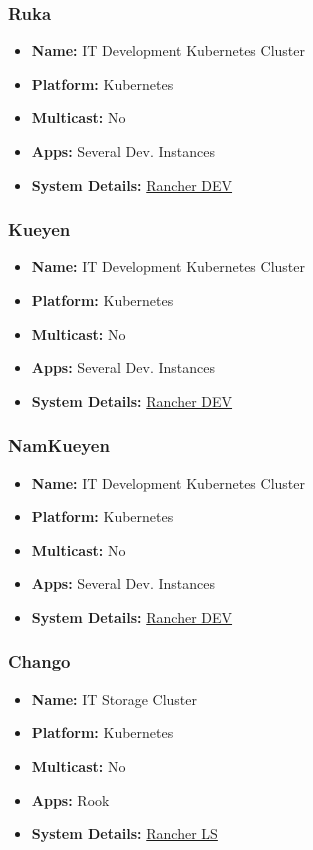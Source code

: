 \subsubsection{Ruka}
\begin{itemize}
  \itemsep0em 
  \item \textbf{Name:}       IT Development Kubernetes Cluster
  \item \textbf{Platform:}   Kubernetes
  \item \textbf{Multicast:}  No
  \item \textbf{Apps:}       Several Dev. Instances
  \item \textbf{System Details:} \href{https://rancher.dev.lsst.org}{Rancher DEV}
\end{itemize}

\subsubsection{Kueyen}
\begin{itemize}
  \itemsep0em 
  \item \textbf{Name:}       IT Development Kubernetes Cluster
  \item \textbf{Platform:}   Kubernetes
  \item \textbf{Multicast:}  No
  \item \textbf{Apps:}       Several Dev. Instances
  \item \textbf{System Details:} \href{https://rancher.dev.lsst.org}{Rancher DEV}
\end{itemize}

\subsubsection{NamKueyen}
\begin{itemize}
  \itemsep0em 
  \item \textbf{Name:}       IT Development Kubernetes Cluster
  \item \textbf{Platform:}   Kubernetes
  \item \textbf{Multicast:}  No
  \item \textbf{Apps:}       Several Dev. Instances
  \item \textbf{System Details:} \href{https://rancher.dev.lsst.org}{Rancher DEV}
\end{itemize}

\subsubsection{Chango}
\begin{itemize}
  \itemsep0em 
  \item \textbf{Name:}       IT Storage Cluster
  \item \textbf{Platform:}   Kubernetes
  \item \textbf{Multicast:}  No
  \item \textbf{Apps:}       Rook
  \item \textbf{System Details:} \href{https://rancher.ls.lsst.org}{Rancher LS}
\end{itemize}


